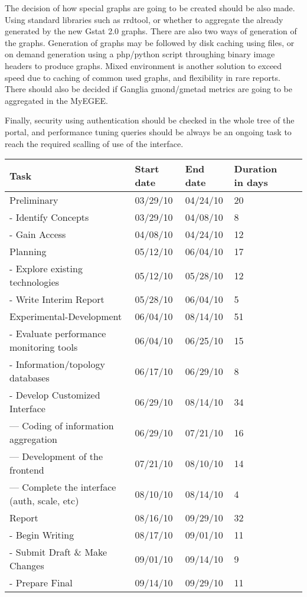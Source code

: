The decision of how special graphs are going to be created should be also made. Using standard libraries such as rrdtool, or whether to aggregate the already generated by the new Gstat 2.0 graphs. There are also two ways of generation of the graphs. Generation of graphs may be followed by disk caching using files, or on demand generation using a php/python script throughing binary image headers to produce graphs. Mixed environment is another solution to exceed speed due to caching of common used graphs, and flexibility in rare reports. There should also be decided if Ganglia gmond/gmetad metrics are going to be aggregated in the MyEGEE. 

Finally, security using authentication should be checked in the whole tree of the portal, and performance tuning queries should be always be an ongoing task to reach the required scalling of use of the interface.

\begin{table}[ht]
\begin{tabular}{ | l | l | l | l | r |}
\hline
Task & Start date & End date & Duration in days \\ \hline
  Preliminary & 03/29/10 & 04/24/10 & 20 \\ \hline 
  -  Identify Concepts & 03/29/10 & 04/08/10 & 8 \\ \hline 
  -  Gain Access & 04/08/10 & 04/24/10 & 12 \\ \hline 
  Planning & 05/12/10 & 06/04/10 & 17 \\ \hline 
  -  Explore existing technologies & 05/12/10 & 05/28/10 & 12 \\ \hline 
  -  Write Interim Report & 05/28/10 & 06/04/10 & 5 \\ \hline 
  Experimental-Development & 06/04/10 & 08/14/10 & 51 \\ \hline 
  -  Evaluate performance monitoring tools & 06/04/10 & 06/25/10 & 15 \\ \hline 
  -  Information/topology databases & 06/17/10 & 06/29/10 & 8 \\ \hline 
  -  Develop Customized Interface & 06/29/10 & 08/14/10 & 34 \\ \hline 
  ---    Coding of information aggregation & 06/29/10 & 07/21/10 & 16 \\ \hline 
  ---    Development of the frontend & 07/21/10 & 08/10/10 & 14 \\ \hline 
  ---    Complete the interface (auth, scale, etc) & 08/10/10 & 08/14/10 & 4 \\
      \hline Report & 08/16/10 & 09/29/10 & 32 \\ \hline 
  -  Begin Writing & 08/17/10 & 09/01/10 & 11 \\ \hline 
  -  Submit Draft \& Make Changes & 09/01/10 & 09/14/10 & 9 \\ \hline 
  -  Prepare Final & 09/14/10 & 09/29/10 & 11 \\ \hline 
\end{tabular}
\label{tab:tasks}
\end{table}


